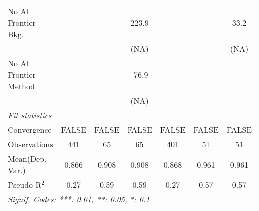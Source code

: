 \begin{tabular}{lcccccc}
   No AI Frontier - Bkg.   &        &       & 223.9  &       &       & 33.2\\   
                           &        &       & (NA)   &       &       & (NA)\\   
   No AI Frontier - Method &        &       & -76.9  &       &       &   \\   
                           &        &       & (NA)   &       &       &   \\   
   \midrule
   \emph{Fit statistics}\\
   Convergence             &FALSE   & FALSE & FALSE  & FALSE & FALSE & FALSE\\  
   Observations            & 441    & 65    & 65     & 401   & 51    & 51\\  
Mean(Dep. Var.) & 0.866 & 0.908 & 0.908 & 0.868 & 0.961 & 0.961 \\
   Pseudo R$^2$            & 0.27   & 0.59  & 0.59   & 0.27  & 0.57  & 0.57\\  
   \midrule \midrule
   \multicolumn{7}{l}{\emph{Signif. Codes: ***: 0.01, **: 0.05, *: 0.1}}\\
\end{tabular}
\par\endgroup
